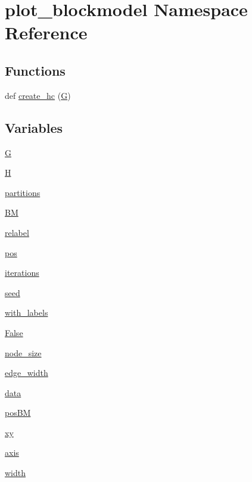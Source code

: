 \hypertarget{namespaceplot__blockmodel}{}\section{plot\+\_\+blockmodel Namespace Reference}
\label{namespaceplot__blockmodel}
\subsection*{Functions}
\begin{DoxyCompactItemize}
\item 
def \hyperlink{namespaceplot__blockmodel_a39fd3ba7c59f33a7e9117efa06c37cc7}{create\+\_\+hc} (\hyperlink{namespaceplot__blockmodel_aa1077094c3bcce46d885616131b65c75}{G})
\end{DoxyCompactItemize}
\subsection*{Variables}
\begin{DoxyCompactItemize}
\item 
\hyperlink{namespaceplot__blockmodel_aa1077094c3bcce46d885616131b65c75}{G}
\item 
\hyperlink{namespaceplot__blockmodel_adcdf47f3565f6507a473be278f1b2724}{H}
\item 
\hyperlink{namespaceplot__blockmodel_a0990f28445beaed009aa3de0550b5d90}{partitions}
\item 
\hyperlink{namespaceplot__blockmodel_a7e27ec5e2060dc07088a4c460e80d96d}{BM}
\item 
\hyperlink{namespaceplot__blockmodel_af0659e6473dd0fd3d16cd28bcc253cc3}{relabel}
\item 
\hyperlink{namespaceplot__blockmodel_a9e5d6b61eb3e111149a951056a933c03}{pos}
\item 
\hyperlink{namespaceplot__blockmodel_a9425c8e00187e0f692caff8e154fc8ff}{iterations}
\item 
\hyperlink{namespaceplot__blockmodel_a989c61c355c7d3e422680dbf5180a6c5}{seed}
\item 
\hyperlink{namespaceplot__blockmodel_a857e3b619cf027a41b8ae00aaf6945dc}{with\+\_\+labels}
\item 
\hyperlink{namespaceplot__blockmodel_a9ecd44717fd9513caf58cdf9a0d4385d}{False}
\item 
\hyperlink{namespaceplot__blockmodel_ad7ed61a6a4ece8c13033f54dd413ff90}{node\+\_\+size}
\item 
\hyperlink{namespaceplot__blockmodel_aa924eaa2f590da1d8413f820a9eca10e}{edge\+\_\+width}
\item 
\hyperlink{namespaceplot__blockmodel_abd9d2865106809bdba3896e82d2d4f54}{data}
\item 
\hyperlink{namespaceplot__blockmodel_a6b338ff5d48aee7fdd82ad90773f013a}{pos\+BM}
\item 
\hyperlink{namespaceplot__blockmodel_af868e0a7b56c4cb07c9e72e50016e976}{xy}
\item 
\hyperlink{namespaceplot__blockmodel_af45cd66289ef1c26af661fc6084e6a76}{axis}
\item 
\hyperlink{namespaceplot__blockmodel_a7df3186406fae883c5e4b2f62082002f}{width}
\end{DoxyCompactItemize}


